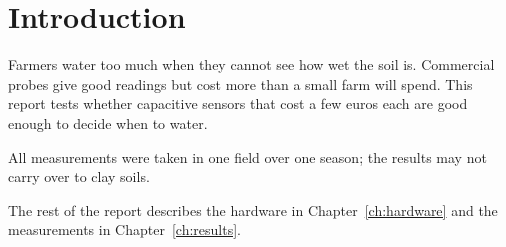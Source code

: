 \chapter{Introduction}

Farmers water too much when they cannot see how wet the soil is. Commercial
probes give good readings but cost more than a small farm will spend. This
report tests whether capacitive sensors that cost a few euros each are good
enough to decide when to water.

\begin{remark}
All measurements were taken in one field over one season; the results may not
carry over to clay soils.
\end{remark}

The rest of the report describes the hardware in Chapter~\ref{ch:hardware}
and the measurements in Chapter~\ref{ch:results}.
